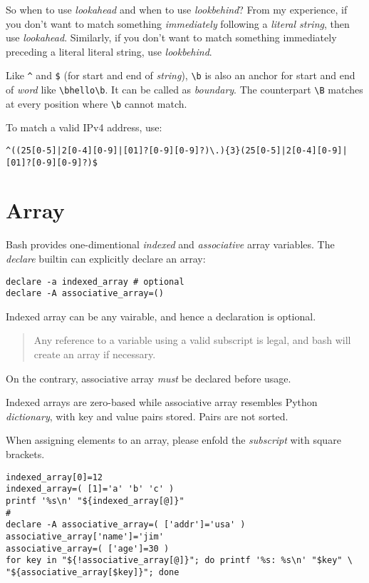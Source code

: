 So when to use \textit{lookahead} and when to use
\textit{lookbehind}? From my experience, if you don't want
to match something \textit{immediately} following a
\textit{literal string}, then use \textit{lookahead}. Similarly,
if you don't want to match something immediately preceding a
literal literal string, use \textit{lookbehind}.

Like \lstinline|^| and
\lstinline|$| (for start and end of \textit{string}),
\lstinline|\b| is also an anchor for start and end of
\textit{word} like \lstinline|\bhello\b|. It can be called as
\textit{boundary}. The counterpart \lstinline|\B| matches at every
position where \lstinline|\b| cannot match.

To match a valid IPv4 address, use:

\begin{lstlisting}
^((25[0-5]|2[0-4][0-9]|[01]?[0-9][0-9]?)\.){3}(25[0-5]|2[0-4][0-9]|[01]?[0-9][0-9]?)$
\end{lstlisting}

\section{Array}
\label{sec:bash-array}

Bash provides one-dimentional \textit{indexed} and
\textit{associative} array variables. The \textit{declare} builtin
can explicitly declare an array:

\begin{lstlisting}
declare -a indexed_array # optional
declare -A associative_array=()
\end{lstlisting}

Indexed array can be any vairable, and hence a declaration is
optional.

\begin{quotation}
  Any reference to a variable using a valid subscript is legal,
  and bash will create an array if necessary.
\end{quotation}

On the contrary, associative array \textit{must} be
declared before usage.

Indexed arrays are zero-based while associative array resembles
Python \textit{dictionary}, with key and value pairs stored. Pairs
are not sorted.

When assigning elements to an array, please enfold the
\textit{subscript} with square brackets.

\begin{lstlisting}
indexed_array[0]=12
indexed_array=( [1]='a' 'b' 'c' )
printf '%s\n' "${indexed_array[@]}"
#
declare -A associative_array=( ['addr']='usa' )
associative_array['name']='jim'
associative_array=( ['age']=30 )
for key in "${!associative_array[@]}"; do printf '%s: %s\n' "$key" \
"${associative_array[$key]}"; done
\end{lstlisting}

